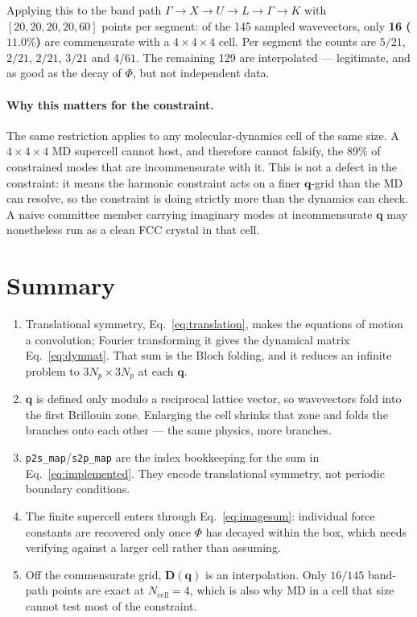 \documentclass[11pt]{article}
\newcommand{\code}[1]{\texttt{\small #1}}
\begin{document}
Applying this to the band path $\Gamma\to X\to U\to L\to\Gamma\to K$ with
$[20,20,20,20,60]$ points per segment: of the 145 sampled wavevectors, only
\textbf{16 ($11.0\%$)} are commensurate with a $4\times4\times4$ cell. Per
segment the counts are $5/21$, $2/21$, $2/21$, $3/21$ and $4/61$. The remaining
129 are interpolated --- legitimate, and as good as the decay of $\Phi$, but not
independent data.

\paragraph{Why this matters for the constraint.} The same restriction applies to
any molecular-dynamics cell of the same size. A $4\times4\times4$ MD supercell
cannot host, and therefore cannot falsify, the $89\%$ of constrained modes that
are incommensurate with it. This is not a defect in the constraint: it means the
harmonic constraint acts on a finer $\bm q$-grid than the MD can resolve, so the
constraint is doing strictly more than the dynamics can check. A naive committee
member carrying imaginary modes at incommensurate $\bm q$ may nonetheless run as
a clean FCC crystal in that cell.

\section*{Summary}

\begin{enumerate}
  \item Translational symmetry, Eq.~\eqref{eq:translation}, makes the equations
        of motion a convolution; Fourier transforming it gives the dynamical
        matrix Eq.~\eqref{eq:dynmat}. That sum is the Bloch folding, and it
        reduces an infinite problem to $3N_p\times3N_p$ at each $\bm q$.
  \item $\bm q$ is defined only modulo a reciprocal lattice vector, so
        wavevectors fold into the first Brillouin zone. Enlarging the cell
        shrinks that zone and folds the branches onto each other --- the same
        physics, more branches.
  \item \code{p2s\_map}/\code{s2p\_map} are the index bookkeeping for the sum in
        Eq.~\eqref{eq:implemented}. They encode translational symmetry, not
        periodic boundary conditions.
  \item The finite supercell enters through Eq.~\eqref{eq:imagesum}: individual
        force constants are recovered only once $\Phi$ has decayed within the
        box, which needs verifying against a larger cell rather than assuming.
  \item Off the commensurate grid, $\bm D(\bm q)$ is an interpolation. Only
        $16/145$ band-path points are exact at $N_{\mathrm{cell}}=4$, which is
        also why MD in a cell that size cannot test most of the constraint.
\end{enumerate}
\end{document}
